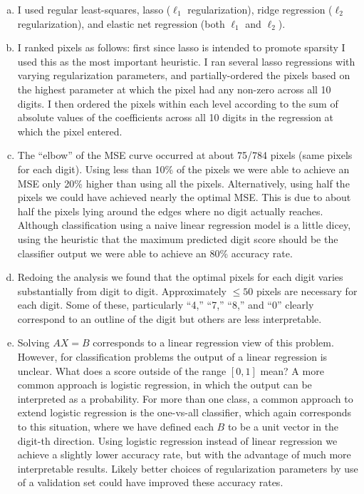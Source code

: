 \documentclass[letter, 12pt]{article}
\begin{document}
\begin{enumerate}[(a)]
\item I used regular least-squares, lasso ($\ell_1$ regularization), ridge regression ($\ell_2$ regularization), and elastic net regression (both $\ell_1$ and $\ell_2$).
\item I ranked pixels as follows: first since lasso is intended to promote sparsity I used this as the most important heuristic. I ran several lasso regressions with varying regularization parameters, and partially-ordered the pixels based on the highest parameter at which the pixel had any non-zero across all 10 digits. I then ordered the pixels within each level according to the sum of absolute values of the coefficients across all 10 digits in the regression at which the pixel entered.
\item The ``elbow'' of the MSE curve occurred at about 75/784 pixels (same pixels for each digit). Using less than 10\% of the pixels we were able to achieve an MSE only 20\% higher than using all the pixels. Alternatively, using half the pixels we could have achieved nearly the optimal MSE. This is due to about half the pixels lying around the edges where no digit actually reaches. Although classification using a naive linear regression model is a little dicey, using the heuristic that the maximum predicted digit score should be the classifier output we were able to achieve an 80\% accuracy rate.
\item Redoing the analysis we found that the optimal pixels for each digit varies substantially from digit to digit. Approximately $\leq 50$ pixels are necessary for each digit. Some of these, particularly ``4,'' ``7,'' ``8,'' and ``0'' clearly correspond to an outline of the digit but others are less interpretable. 
\item Solving $AX=B$ corresponds to a linear regression view of this problem. However, for classification problems the output of a linear regression is unclear. What does a score outside of the range $[0,1]$ mean? A more common approach is logistic regression, in which the output can be interpreted as a probability. For more than one class, a common approach to extend logistic regression is the one-vs-all classifier, which again corresponds to this situation, where we have defined each $B$ to be a unit vector in the digit-th direction. Using logistic regression instead of linear regression we achieve a slightly lower accuracy rate, but with the advantage of much more interpretable results. Likely better choices of regularization parameters by use of a validation set could have improved these accuracy rates.
\end{enumerate}


\pagebreak
\end{document}
